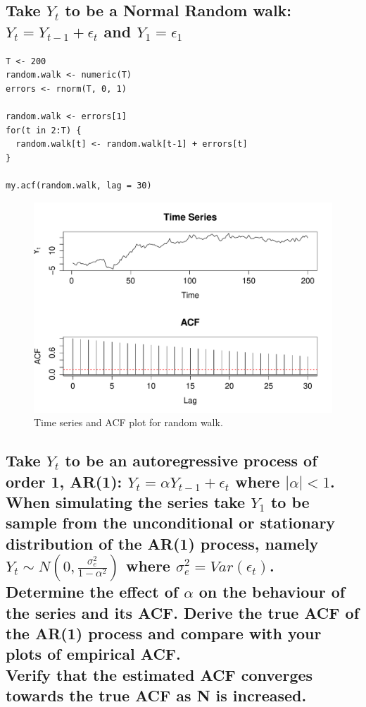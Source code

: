 \documentclass[10pt,a4paper]{article}
\let\Oldsubsection\subsection
\renewcommand{\subsection}{\FloatBarrier\Oldsubsection}
\begin{document}
\subsection{Take $Y_t$ to be a Normal Random walk: 
$Y_t = Y_{t-1} + \epsilon_t$ and $Y_1 = \epsilon_1$}
\begin{lstlisting}
T <- 200
random.walk <- numeric(T)
errors <- rnorm(T, 0, 1)

random.walk <- errors[1]
for(t in 2:T) {
  random.walk[t] <- random.walk[t-1] + errors[t]
}

my.acf(random.walk, lag = 30)
\end{lstlisting}
\begin{figure}[ht]
\includegraphics[width=\linewidth]{plots/p4.pdf}
\caption{Time series and ACF plot for random walk.}
\end{figure}

\subsection{Take $Y_t$ to be an autoregressive process of order 1, AR(1):
$Y_t = \alpha Y_{t-1} + \epsilon_t$ where $|\alpha| < 1$. \\
When simulating the series take $Y_1$ to be sample from the unconditional or stationary
distribution of the AR(1) process, namely
$Y_t \sim N\left(0, \frac{\sigma_e^2}{1 - \alpha^2}\right)$
where $\sigma_e^2 = Var(\epsilon_t)$.\\
Determine the effect of $\alpha$ on the behaviour of the series and its ACF. Derive the true ACF of the AR(1) process and compare with your plots of
empirical ACF. \\
Verify that the estimated ACF converges towards the true ACF as
N is increased.}
\end{document}
